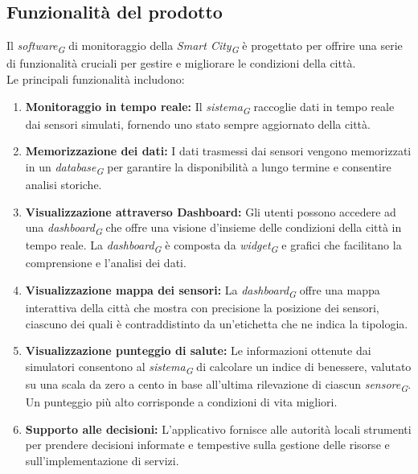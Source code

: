 \subsection{Funzionalità del prodotto}

Il \textit{software}\textsubscript{\textit{G}} di monitoraggio della \textit{Smart City}\textsubscript{\textit{G}} è progettato per offrire una serie di funzionalità cruciali per gestire e migliorare le condizioni della città. \\
Le principali funzionalità includono:

\begin{enumerate}
    \item \textbf{Monitoraggio in tempo reale:} Il \textit{sistema}\textsubscript{\textit{G}} raccoglie dati in tempo reale dai sensori simulati, fornendo uno stato sempre aggiornato della città.

    \item \textbf{Memorizzazione dei dati:} I dati trasmessi dai sensori vengono memorizzati in un \textit{database}\textsubscript{\textit{G}} per garantire la disponibilità a lungo termine e consentire analisi storiche.

    \item \textbf{Visualizzazione attraverso Dashboard:} Gli utenti possono accedere ad una \textit{dashboard}\textsubscript{\textit{G}} che offre una visione d’insieme delle condizioni della città in tempo reale. La \textit{dashboard}\textsubscript{\textit{G}} è composta da \textit{widget}\textsubscript{\textit{G}} e grafici che facilitano la comprensione e l'analisi dei dati.
    
    \item \textbf{Visualizzazione mappa dei sensori:} La \textit{dashboard}\textsubscript{\textit{G}} offre una mappa interattiva della città che mostra con precisione la posizione dei sensori, ciascuno dei quali è contraddistinto da un'etichetta che ne indica la tipologia.

    \item \textbf{Visualizzazione punteggio di salute:} Le informazioni ottenute dai simulatori consentono al \textit{sistema}\textsubscript{\textit{G}} di calcolare un indice di benessere, valutato su una scala da zero a cento in base all'ultima rilevazione di ciascun \textit{sensore}\textsubscript{\textit{G}}. Un punteggio più alto corrisponde a condizioni di vita migliori.

    \item \textbf{Supporto alle decisioni:} L'applicativo fornisce alle autorità locali strumenti per prendere decisioni informate e tempestive sulla gestione delle risorse e sull'implementazione di servizi.
    

\end{enumerate}
